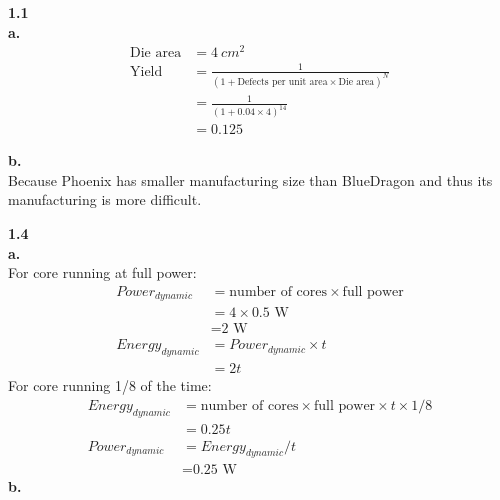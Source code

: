 \documentclass{article}
\begin{document}
\noindent\textbf{1.1}\\
\indent \textbf{a.}\\
\begin{align*}
    \text{Die area} &= 4\ cm^2\\
    \text{Yield} &= \frac{1}{{(1+\text{Defects per unit area}\times \text{Die area})}^N}\\
    &= \frac{1}{{(1+0.04\times 4)}^{14}}\\
    &=0.125
\end{align*}

\indent \textbf{b.}\\
\indent Because Phoenix has smaller manufacturing size than BlueDragon and thus its manufacturing is more difficult.

\noindent\textbf{1.4}\\
\indent \textbf{a.}\\
\indent For core running at full power:\\
\begin{align*}
    Power_{dynamic}&=\text{number of cores}\times \text{full power}\\
    &=4\times \text{0.5 W}\\
    &=\text{2 W}\\
    Energy_{dynamic}&=Power_{dynamic}\times t\\
    &=2t
\end{align*}
\indent For core running 1/8 of the time:
\begin{align*}
    Energy_{dynamic}&=\text{number of cores}\times \text{full power}\times t\times 1/8\\
    &=0.25t\\
    Power_{dynamic}&=Energy_{dynamic}/t\\
    &=\text{0.25 W}
\end{align*}
\indent \textbf{b.}\\
\end{document}
